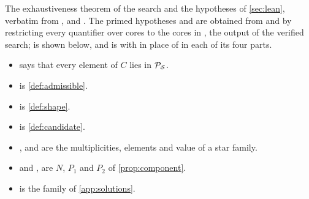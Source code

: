 \documentclass[11pt]{article}
\begin{document}
The exhaustiveness theorem of the search and the hypotheses of \cref{sec:lean}, verbatim from ,  and .
The primed hypotheses  and  are obtained from  and  by restricting every quantifier over cores  to the cores in , the output of the verified search;  is shown below, and  is  with  in place of  in each of its four parts.
\begin{itemize}
\item {} says that every element of $C$ lies in $\mathcal{P}_{\mathcal{S}}$.
\item {} is \cref{def:admissible}.
\item {} is \cref{def:shape}.
\item {} is \cref{def:candidate}.
\item {},  and  are the multiplicities, elements and value of a star family.
\item {} and ,  are $N$, $P_1$ and $P_2$ of \cref{prop:component}.
\item {} is the family of \cref{app:solutions}.
\end{itemize}
\fontsize{8.3}{9.6}\selectfont
\end{document}
